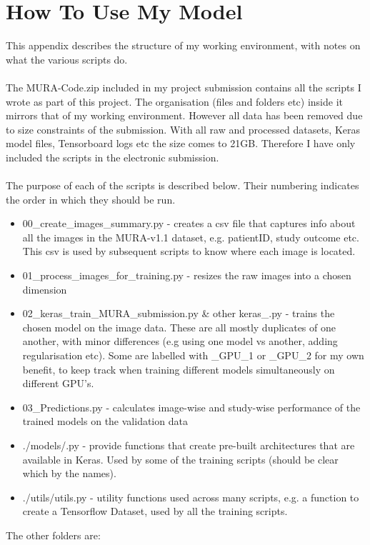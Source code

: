 \documentclass[11pt]{article} %
\theoremstyle{plain}
\theoremstyle{definition}
\begin{document}
\section{How To Use My Model}
This appendix describes the structure of my working environment, with notes on what the various scripts do. 
\\
\\
\noindent
The MURA-Code.zip included in my project submission contains all the scripts I wrote as part of this project. The organisation (files and folders etc) inside it mirrors that of my working environment. However all data has been removed due to size constraints of the submission. With all raw and processed datasets, Keras model files, Tensorboard logs etc the size comes to 21GB. Therefore I have only included the scripts in the electronic submission. 
\\
\\
\noindent
The purpose of each of the scripts is described below. Their numbering indicates the order in which they should be run.
\begin{itemize}
\item 00\_create\_images\_summary.py - creates a csv file that captures info about all the images in the MURA-v1.1 dataset, e.g. patientID, study outcome etc. This csv is used by subsequent scripts to know where each image is located.
\item 01\_process\_images\_for\_training.py - resizes the raw images into a chosen dimension
\item 02\_keras\_train\_MURA\_submission.py \& other keras\_\*.py - trains the chosen model on the image data. These are all mostly duplicates of one another, with minor differences (e.g using one model vs another, adding regularisation etc). Some are labelled with \_GPU\_1 or \_GPU\_2 for my own benefit, to keep track when training different models simultaneously on different GPU's.
\item 03\_Predictions.py - calculates image-wise and study-wise performance of the trained models on the validation data
\item ./models/\*.py  - provide functions that create pre-built architectures that are available in Keras. Used by some of the training scripts (should be clear which by the names).
\item ./utils/utils.py - utility functions used across many scripts, e.g. a function to create a Tensorflow Dataset, used by all the training scripts.
\end{itemize}
\noindent
The other folders are:
\end{document}
